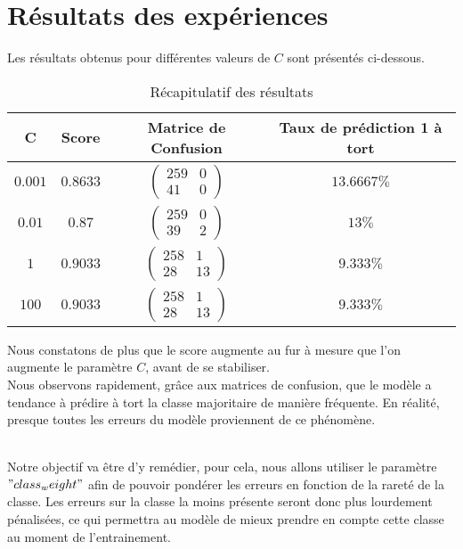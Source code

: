 \documentclass{article}
\begin{document}
\section*{Résultats des expériences}

Les résultats obtenus pour différentes valeurs de \( C \) sont présentés ci-dessous.


\begin{table}[th]
    \centering
    \begin{tabular}{|c|c|c|c|}
        \hline
        C & Score & Matrice de Confusion & Taux de prédiction 1 à tort\\
        \hline
        $0.001$ & $0.8633$ & $\begin{pmatrix} 259 & 0 \\ 41 & 0 \end{pmatrix}$ & $13.6667 \%$ \\
        \hline
        $0.01$ & $0.87$ & $\begin{pmatrix} 259 & 0 \\ 39 & 2 \end{pmatrix}$ & $13 \%$ \\
        \hline
        $1$ & $0.9033$ & $\begin{pmatrix} 258 & 1 \\ 28 & 13 \end{pmatrix}$ & $9.333 \%$ \\
        \hline
        $100$ & $0.9033$ & $\begin{pmatrix} 258 & 1 \\ 28 & 13 \end{pmatrix}$ & $9.333 \%$ \\
        \hline       
    \end{tabular}
    \caption{Récapitulatif des résultats}
    \label{tab:my_label}
\end{table}
Nous constatons de plus que le score augmente au fur à mesure que l'on augmente le paramètre $C$, avant de se stabiliser.\\

Nous observons rapidement, grâce aux matrices de confusion, que le modèle a tendance à prédire à tort la classe majoritaire de manière fréquente. En réalité, presque toutes les erreurs du modèle proviennent de ce phénomène.

\\




Notre objectif va être d'y remédier, pour cela, nous allons utiliser le paramètre $"class_weight"$ afin de pouvoir pondérer les erreurs en fonction de la rareté de la classe. Les erreurs sur la classe la moins présente seront donc plus lourdement pénalisées, ce qui permettra au modèle de mieux prendre en compte cette classe au moment de l'entrainement.
\end{document}

